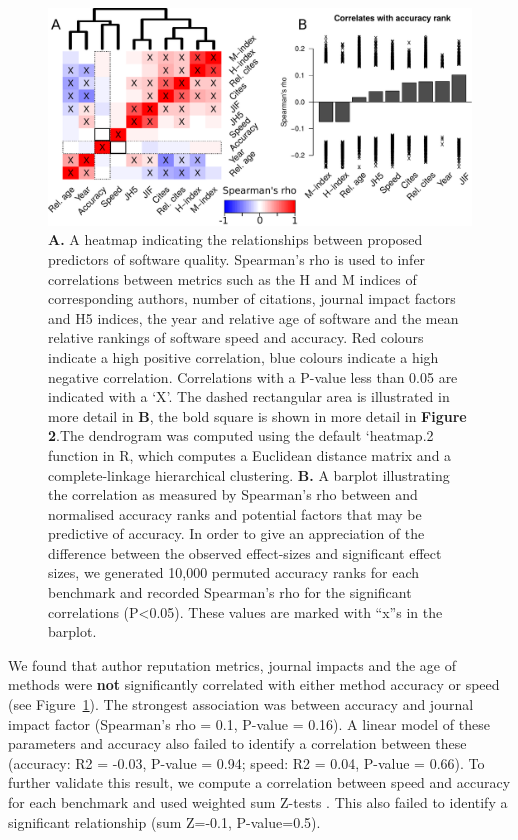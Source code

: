 \documentclass[fleqn,10pt]{SelfArx} %
\begin{document}
\begin{figure}[h]
\includegraphics[width=\textwidth]{figure1.pdf}
\caption{\textbf{A.} A heatmap indicating the relationships between proposed predictors of software quality. Spearman’s rho is used to infer correlations between metrics such as the H and M indices of corresponding authors, number of citations, journal impact factors and H5 indices, the year and relative age of software and the mean relative rankings of software speed and accuracy. Red colours indicate a high positive correlation, blue colours indicate a high negative correlation. Correlations with a P-value less than 0.05 are indicated with a ‘X’. The dashed rectangular area is illustrated in more detail in \textbf{B}, the bold square is shown in more detail in \textbf{Figure 2}.The dendrogram was computed using the default ‘heatmap.2 function in R, which computes a Euclidean distance matrix and a complete-linkage hierarchical clustering. \textbf{B.} A barplot illustrating the correlation as measured by Spearman’s rho between and normalised accuracy ranks and potential factors that may be predictive of accuracy. In order to give an appreciation of the difference between the observed effect-sizes and significant effect sizes, we generated 10,000 permuted accuracy ranks for each benchmark and recorded Spearman’s rho for the significant correlations (P<0.05). These values are marked with “x”s in the barplot.}
\label{fig:allfactors}
\end{figure}


We found that author reputation metrics, journal impacts and the age of methods were \textbf{not} significantly correlated with either method accuracy or speed (see Figure~\ref{fig:allfactors}). The strongest association was between accuracy and journal impact factor (Spearman’s rho = 0.1, P-value = 0.16). A linear model of these parameters and accuracy also failed to identify a correlation between these (accuracy: R2 = -0.03, P-value = 0.94; speed: R2 = 0.04, P-value = 0.66). To further validate this result, we compute a correlation between speed and accuracy for each benchmark and used weighted sum Z-tests \cite{Zaykin2011-tj}. This also failed to identify a significant relationship (sum Z=-0.1, P-value=0.5).
\end{document}
